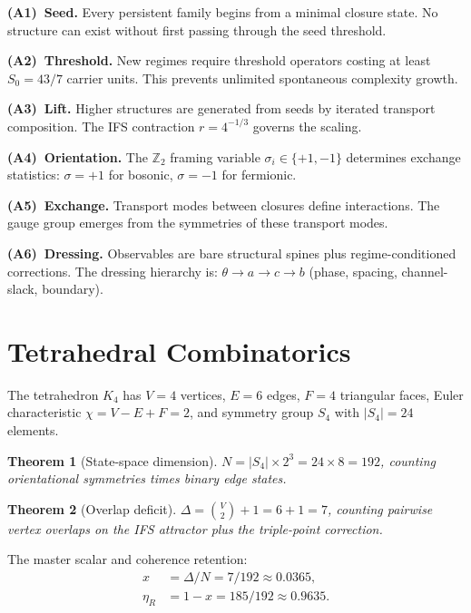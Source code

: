 \documentclass[11pt,twocolumn]{article}
\newtheorem{theorem}{Theorem}
\begin{document}
\textbf{(A1)~Seed.}
Every persistent family begins from a minimal closure state.
No structure can exist without first passing through the seed threshold.

\textbf{(A2)~Threshold.}
New regimes require threshold operators costing at least $S_0=43/7$ carrier units.
This prevents unlimited spontaneous complexity growth.

\textbf{(A3)~Lift.}
Higher structures are generated from seeds by iterated transport composition.
The IFS contraction $r=4^{-1/3}$ governs the scaling.

\textbf{(A4)~Orientation.}
The $\mathbb{Z}_2$ framing variable $\sigma_i\in\{+1,-1\}$ determines exchange statistics: $\sigma=+1$ for bosonic, $\sigma=-1$ for fermionic.

\textbf{(A5)~Exchange.}
Transport modes between closures define interactions.
The gauge group emerges from the symmetries of these transport modes.

\textbf{(A6)~Dressing.}
Observables are bare structural spines plus regime-conditioned corrections.
The dressing hierarchy is: $\theta\to a\to c\to b$ (phase, spacing, channel-slack, boundary).

\section{Tetrahedral Combinatorics}
\label{sec:K4}

The tetrahedron $K_4$ has $V=4$ vertices, $E=6$ edges, $F=4$ triangular faces, Euler characteristic $\chi=V-E+F=2$, and symmetry group $S_4$ with $|S_4|=24$ elements.

\begin{theorem}[State-space dimension]
\label{thm:N}
$N=|S_4|\times 2^3=24\times 8=192$, counting orientational symmetries times binary edge states.
\end{theorem}

\begin{theorem}[Overlap deficit]
\label{thm:Delta}
$\Delta=\binom{V}{2}+1=6+1=7$, counting pairwise vertex overlaps on the IFS attractor plus the triple-point correction.
\end{theorem}

The master scalar and coherence retention:
\begin{align}
x &= \Delta/N = 7/192 \approx 0.0365, \label{eq:x}\\
\eta_R &= 1-x = 185/192 \approx 0.9635. \label{eq:eta}
\end{align}
\end{document}
